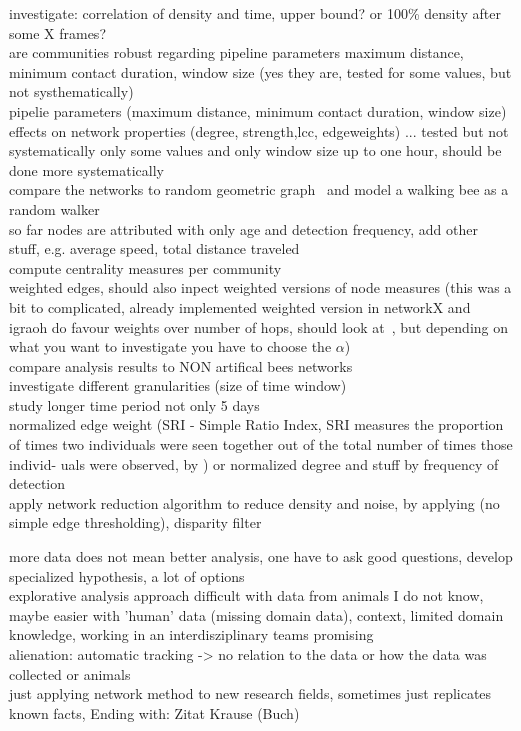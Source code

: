 investigate: correlation of density and time, upper bound? or 100\% density after some X frames?\\
are communities robust regarding pipeline parameters maximum distance, minimum contact duration, window size (yes they are, tested for some values, but not systhematically)\\
pipelie parameters (maximum distance, minimum contact duration, window size) effects on network properties (degree, strength,lcc, edgeweights) ... tested but not systematically only some values and only window size up to one hour, should be done more systematically\\
compare the networks to random geometric graph~\cite{rgg2002} and model a walking bee as a random walker\\
so far nodes are attributed with only age and detection frequency, add other stuff, e.g. average speed, total distance traveled\\
compute centrality measures per community\\
weighted edges, should also inpect weighted versions of node measures (this was a bit to complicated, already implemented weighted version in networkX and igraoh do favour weights over number of hops, should look at~\textcite{opsahl2010node}, but depending on what you want to investigate you have to choose the $\alpha$)\\
compare analysis results to NON artifical bees networks\\
investigate different granularities (size of time window)\\
study longer time period not only 5 days\\
normalized edge weight (SRI - Simple Ratio Index, SRI measures
the proportion of times two individuals were seen
together out of the total number of times those individ-
uals were observed, by \textcite{croft2008exploring}) or normalized degree and stuff by frequency of detection\\
apply network reduction algorithm to reduce density and noise, by applying (no simple edge thresholding), disparity filter~\textcite{serrano2009extracting}

\vspace{2cm}
more data does not mean better analysis, one have to ask good questions, develop specialized hypothesis, a lot of options\\
explorative analysis approach difficult with data from animals I do not know, maybe easier with 'human' data (missing domain data), context, limited domain knowledge, working in an interdisziplinary teams promising\\
alienation: automatic tracking -> no relation to the data or how the data was collected or animals\\
just applying network method to new research fields, sometimes just replicates known facts, Ending with: Zitat Krause (Buch)